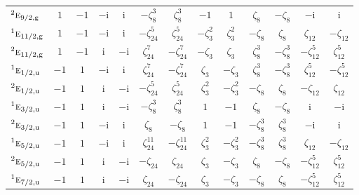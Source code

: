\documentclass[10pt,a4paper]{article}
\numberwithin{equation}{section}
\newcommand{\irr}[1]{\text{\normalfont\scshape #1}}
\newcommand{\conjpair}[1]{{}^{#1}}
\newcommand{\ptag}[1]{\mathrm{#1}}
\newcommand{\iunit}{\mathrm{i}}
\newcommand{\rootunity}[1]{\zeta_{#1}}
\begin{document}
{\begin{longtable}{@{}lcccccccccccc@{}}
$\conjpair{2}\irr{e}_{9/2,\ptag{g}}$ & $1$ & $-1$ & $-\iunit{}$ & $\iunit{}$ & $-\rootunity{8}^{3}$ & $\rootunity{8}^{3}$ & $-1$ & $1$ & $\rootunity{8}$ & $-\rootunity{8}$ & $-\iunit{}$ & $\iunit{}$\\
$\conjpair{1}\irr{e}_{11/2,\ptag{g}}$ & $1$ & $-1$ & $-\iunit{}$ & $\iunit{}$ & $-\rootunity{24}^{5}$ & $\rootunity{24}^{5}$ & $-\rootunity{3}^{2}$ & $\rootunity{3}^{2}$ & $-\rootunity{8}$ & $\rootunity{8}$ & $\rootunity{12}$ & $-\rootunity{12}$\\
$\conjpair{2}\irr{e}_{11/2,\ptag{g}}$ & $1$ & $-1$ & $\iunit{}$ & $-\iunit{}$ & $\rootunity{24}^{7}$ & $-\rootunity{24}^{7}$ & $-\rootunity{3}$ & $\rootunity{3}$ & $\rootunity{8}^{3}$ & $-\rootunity{8}^{3}$ & $-\rootunity{12}^{5}$ & $\rootunity{12}^{5}$\\
$\conjpair{1}\irr{e}_{1/2,\ptag{u}}$ & $-1$ & $1$ & $-\iunit{}$ & $\iunit{}$ & $\rootunity{24}^{7}$ & $-\rootunity{24}^{7}$ & $\rootunity{3}$ & $-\rootunity{3}$ & $\rootunity{8}^{3}$ & $-\rootunity{8}^{3}$ & $\rootunity{12}^{5}$ & $-\rootunity{12}^{5}$\\
$\conjpair{2}\irr{e}_{1/2,\ptag{u}}$ & $-1$ & $1$ & $\iunit{}$ & $-\iunit{}$ & $-\rootunity{24}^{5}$ & $\rootunity{24}^{5}$ & $\rootunity{3}^{2}$ & $-\rootunity{3}^{2}$ & $-\rootunity{8}$ & $\rootunity{8}$ & $-\rootunity{12}$ & $\rootunity{12}$\\
$\conjpair{1}\irr{e}_{3/2,\ptag{u}}$ & $-1$ & $1$ & $\iunit{}$ & $-\iunit{}$ & $-\rootunity{8}^{3}$ & $\rootunity{8}^{3}$ & $1$ & $-1$ & $\rootunity{8}$ & $-\rootunity{8}$ & $\iunit{}$ & $-\iunit{}$\\
$\conjpair{2}\irr{e}_{3/2,\ptag{u}}$ & $-1$ & $1$ & $-\iunit{}$ & $\iunit{}$ & $\rootunity{8}$ & $-\rootunity{8}$ & $1$ & $-1$ & $-\rootunity{8}^{3}$ & $\rootunity{8}^{3}$ & $-\iunit{}$ & $\iunit{}$\\
$\conjpair{1}\irr{e}_{5/2,\ptag{u}}$ & $-1$ & $1$ & $-\iunit{}$ & $\iunit{}$ & $\rootunity{24}^{11}$ & $-\rootunity{24}^{11}$ & $\rootunity{3}^{2}$ & $-\rootunity{3}^{2}$ & $-\rootunity{8}^{3}$ & $\rootunity{8}^{3}$ & $\rootunity{12}$ & $-\rootunity{12}$\\
$\conjpair{2}\irr{e}_{5/2,\ptag{u}}$ & $-1$ & $1$ & $\iunit{}$ & $-\iunit{}$ & $-\rootunity{24}$ & $\rootunity{24}$ & $\rootunity{3}$ & $-\rootunity{3}$ & $\rootunity{8}$ & $-\rootunity{8}$ & $-\rootunity{12}^{5}$ & $\rootunity{12}^{5}$\\
$\conjpair{1}\irr{e}_{7/2,\ptag{u}}$ & $-1$ & $1$ & $\iunit{}$ & $-\iunit{}$ & $\rootunity{24}$ & $-\rootunity{24}$ & $\rootunity{3}$ & $-\rootunity{3}$ & $-\rootunity{8}$ & $\rootunity{8}$ & $-\rootunity{12}^{5}$ & $\rootunity{12}^{5}$\\

\end{longtable}}
\end{document}
